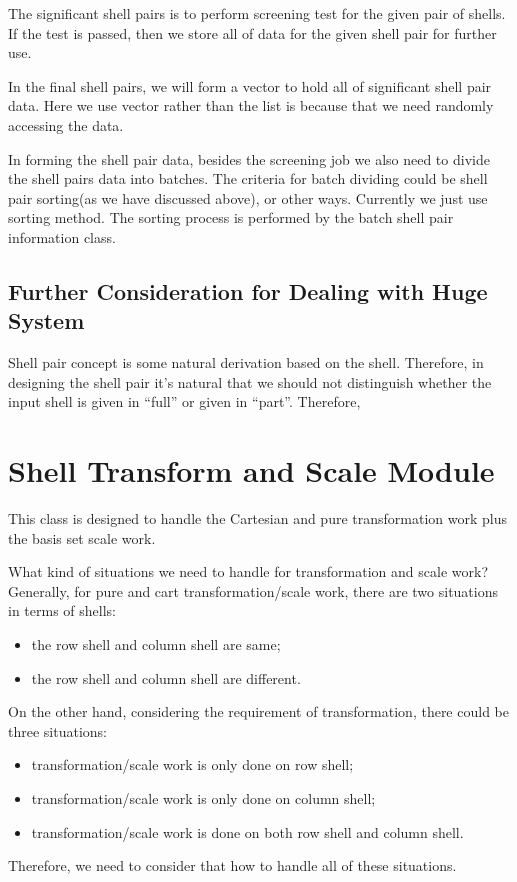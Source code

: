 The significant shell pairs is to perform screening test for the given pair of 
shells. If the test is passed, then we store all of data for the given shell pair
for further use.
 
In the final shell pairs, we will form a vector to hold all of significant shell pair
data. Here we use vector rather than the list is because that we need randomly accessing
the data. 
 
In forming the shell pair data, besides the screening job we also need to divide 
the shell pairs data into batches. The criteria for batch dividing could be 
shell pair sorting(as we have discussed above), or other ways. Currently we just
use sorting method. The sorting process is performed by the batch shell pair
information class.

\subsection{Further Consideration for Dealing with Huge System}

Shell pair concept is some natural derivation based on the shell. Therefore,
in designing the shell pair it's natural that we should not distinguish whether
the input shell is given in ``full'' or given in ``part''. Therefore,

\section{Shell Transform and Scale Module}
  
This class is designed to handle the Cartesian and pure transformation work plus the
basis set scale work.
 
What kind of situations we need to handle for transformation and scale work?
Generally, for pure and cart transformation/scale work, there are two situations in
terms of shells:
\begin{itemize}
  \item the row shell and column shell are same;
  \item the row shell and column shell are different.
\end{itemize}
  
On the other hand, considering the requirement of transformation, there could be
three situations:
\begin{itemize}
  \item transformation/scale work is only done on row shell;
  \item transformation/scale work is only done on column shell;
  \item transformation/scale work is done on both row shell and column shell.
\end{itemize}
Therefore, we need to consider that how to handle all of these situations.
 

